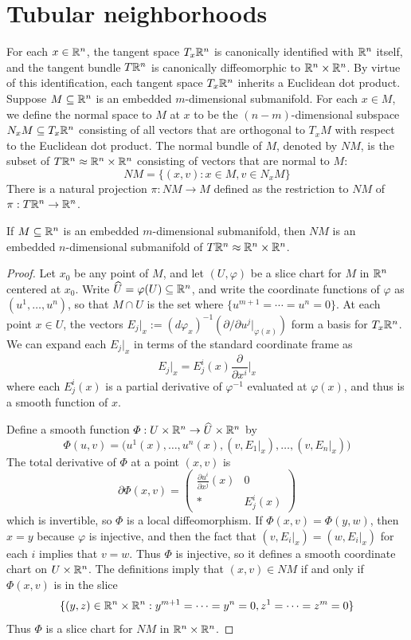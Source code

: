 \section{Tubular neighborhoods}
For each $x\in\mathbb{R}^n$, the tangent space $T_x\mathbb{R}^n$ is canonically identified with $\mathbb{R}^n$ itself, and the tangent bundle $T\mathbb{R}^n$ is canonically diffeomorphic to $\mathbb{R}^n\times\mathbb{R}^n$. By virtue of this identification, each tangent space $T_x\mathbb{R}^n$ inherits a Euclidean dot product. Suppose $M\subseteq\mathbb{R}^n$ is an embedded $m$-dimensional submanifold. For each $x\in M$, we define the normal space to $M$ at $x$ to be the $(n-m)$-dimensional subspace $N_xM\subseteq T_x\mathbb{R}^n$ consisting of all vectors that are orthogonal to $T_xM$ with respect to the Euclidean dot product. The normal bundle of $M$, denoted by $NM$, is the subset of $T\mathbb{R}^n\approx\mathbb{R}^n\times\mathbb{R}^n$ consisting of vectors that are normal to $M$:
\[NM=\{(x,v):x\in M,v\in N_xM\}\]
There is a natural projection $\pi:NM\to M$ defined as the restriction to $NM$ of $\pi:T\mathbb{R}^n\to\mathbb{R}^n$.
\begin{theorem}
If $M\subseteq\mathbb{R}^n$ is an embedded $m$-dimensional submanifold, then $NM$ is an embedded $n$-dimensional submanifold of $T\mathbb{R}^n\approx\mathbb{R}^n\times\mathbb{R}^n$.
\end{theorem}
\begin{proof}
Let $x_0$ be any point of $M$, and let $(U,\varphi)$ be a slice chart for $M$ in $\mathbb{R}^n$ centered at $x_0$. Write $\widehat{U}=\varphi(U)\subseteq\mathbb{R}^n$, and write the coordinate functions of $\varphi$ as $(u^1,\dots,u^n)$, so that $M\cap U$ is the set where $\{u^{m+1}=\cdots=u^n=0\}$. At each point $x\in U$, the vectors $E_j|_x:=(d\varphi_x)^{-1}(\partial/\partial u^j|_{\varphi(x)})$ form a basis for $T_x\mathbb{R}^n$. We can expand each $E_j|_x$ in terms of the standard coordinate frame as
\[E_j|_x=E^i_j(x)\frac{\partial}{\partial x^i}\Big|_x\]
where each $E^i_j(x)$ is a partial derivative of $\varphi^{-1}$ evaluated at $\varphi(x)$, and thus is a smooth function of $x$.\par
Define a smooth function $\varPhi:U\times\mathbb{R}^n\to\widehat{U}\times\mathbb{R}^n$ by
\[\varPhi(u,v)=\big(u^1(x),\dots,u^n(x),(v,E_1|_x),\dots,(v,E_n|_x)\big)\]
The total derivative of $\varPhi$ at a point $(x,v)$ is
\[\partial\varPhi(x,v)=\begin{pmatrix}
\frac{\partial u^i}{\partial x^j}(x)&0\\
*&E^i_j(x)
\end{pmatrix}\]
which is invertible, so $\varPhi$ is a local diffeomorphism. If $\varPhi(x,v)=\varPhi(y,w)$, then $x=y$ because $\varphi$ is injective, and then the fact that $(v,E_i|_x)=(w,E_i|_x)$ for each $i$ implies that $v=w$. Thus $\varPhi$ is injective, so it defines a smooth coordinate chart on $U\times\mathbb{R}^n$. The definitions imply that $(x,v)\in NM$ if and only if $\varPhi(x,v)$ is in the slice
\[\{(y,z)\in\mathbb{R}^n\times\mathbb{R}^n:y^{m+1}=\cdots=y^n=0,z^1=\cdots=z^m=0\}\]
Thus $\varPhi$ is a slice chart for $NM$ in $\mathbb{R}^n\times\mathbb{R}^n$.
\end{proof}
